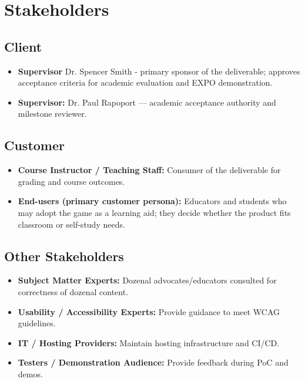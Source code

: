 \documentclass[12pt]{article}
\begin{document}
\section{Stakeholders}

\subsection{Client}
\begin{itemize}
  \item \textbf{Supervisor} Dr. Spencer Smith - primary sponsor of the deliverable; approves acceptance criteria for academic evaluation and EXPO demonstration.
  \item \textbf{Supervisor:} Dr. Paul Rapoport — academic acceptance authority and milestone reviewer.
\end{itemize}

\subsection{Customer}
\begin{itemize}
  \item \textbf{Course Instructor / Teaching Staff:} Consumer of the deliverable for grading and course outcomes.
  \item \textbf{End-users (primary customer persona):} Educators and students who may adopt the game as a learning aid; they decide whether the product fits classroom or self-study needs.
\end{itemize}

\subsection{Other Stakeholders}
\begin{itemize}
  \item \textbf{Subject Matter Experts:} Dozenal advocates/educators consulted for correctness of dozenal content.
  \item \textbf{Usability / Accessibility Experts:} Provide guidance to meet WCAG guidelines.
  \item \textbf{IT / Hosting Providers:} Maintain hosting infrastructure and CI/CD.
  \item \textbf{Testers / Demonstration Audience:} Provide feedback during PoC and demos.
\end{itemize}
\end{document}
